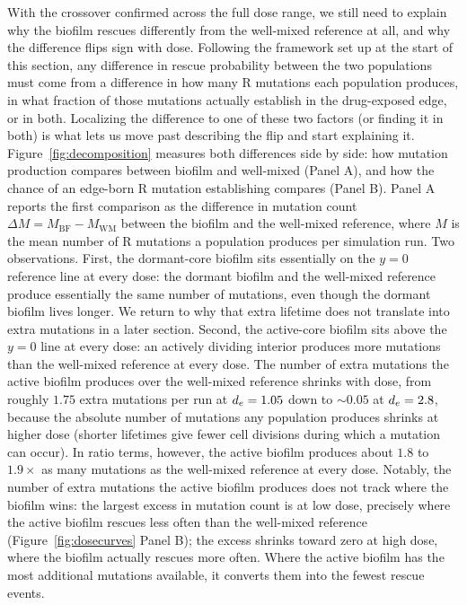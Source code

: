 With the crossover confirmed across the full dose range, we still need to explain why the biofilm rescues differently from the well-mixed reference at all, and why the difference flips sign with dose. Following the framework set up at the start of this section, any difference in rescue probability between the two populations must come from a difference in how many R mutations each population produces, in what fraction of those mutations actually establish in the drug-exposed edge, or in both. Localizing the difference to one of these two factors (or finding it in both) is what lets us move past describing the flip and start explaining it. Figure~\ref{fig:decomposition} measures both differences side by side: how mutation production compares between biofilm and well-mixed (Panel A), and how the chance of an edge-born R mutation establishing compares (Panel B). Panel A reports the first comparison as the difference in mutation count $\Delta M = M_{\mathrm{BF}} - M_{\mathrm{WM}}$ between the biofilm and the well-mixed reference, where $M$ is the mean number of R mutations a population produces per simulation run. Two observations. First, the dormant-core biofilm sits essentially on the $y = 0$ reference line at every dose: the dormant biofilm and the well-mixed reference produce essentially the same number of mutations, even though the dormant biofilm lives longer. We return to why that extra lifetime does not translate into extra mutations in a later section. Second, the active-core biofilm sits above the $y = 0$ line at every dose: an actively dividing interior produces more mutations than the well-mixed reference at every dose. The number of extra mutations the active biofilm produces over the well-mixed reference shrinks with dose, from roughly $1.75$ extra mutations per run at $d_e = 1.05$ down to $\sim 0.05$ at $d_e = 2.8$, because the absolute number of mutations any population produces shrinks at higher dose (shorter lifetimes give fewer cell divisions during which a mutation can occur). In ratio terms, however, the active biofilm produces about $1.8$ to $1.9\times$ as many mutations as the well-mixed reference at every dose. Notably, the number of extra mutations the active biofilm produces does not track where the biofilm wins: the largest excess in mutation count is at low dose, precisely where the active biofilm rescues less often than the well-mixed reference (Figure~\ref{fig:dosecurves} Panel B); the excess shrinks toward zero at high dose, where the biofilm actually rescues more often. Where the active biofilm has the most additional mutations available, it converts them into the fewest rescue events.

